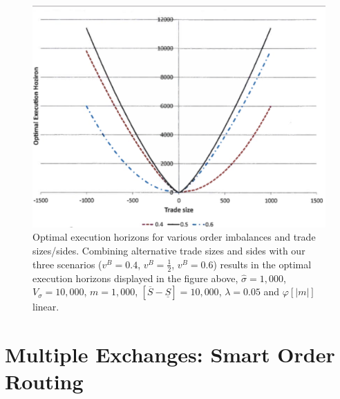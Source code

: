 \begin{figure}[!ht]
   \centering
    \includegraphics[width=\textwidth]{chapters/chapter_exec_models/figures/fig3temp.png}
     \caption{Optimal execution horizons for various order imbalances and trade sizes/sides. Combining alternative trade sizes and sides with our three scenarios ($v^B=0.4$, $v^B=\frac{1}{2}$, $v^B=0.6$) results in the optimal execution horizons displayed in the figure above, $\hat{\sigma}=1,000$, $V_\sigma=10,000$, $m=1,000$, $[\overline{S}-\underline{S}]=10,000$, $\lambda=0.05$ and $\varphi[|m|]$ linear. \label{fig:3temp}}
\end{figure}



\section{Multiple Exchanges:  Smart Order Routing}

